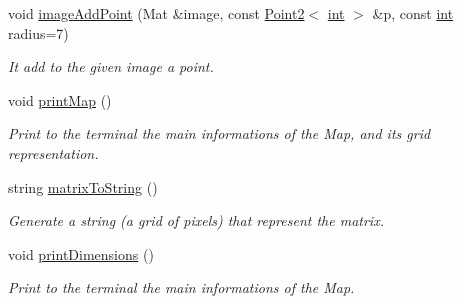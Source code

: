 \begin{DoxyCompactItemize}
void \mbox{\hyperlink{class_mapp_a198e313f3473420c99e6206645f94693}{image\+Add\+Point}} (Mat \&image, const \mbox{\hyperlink{class_point2}{Point2}}$<$ \mbox{\hyperlink{draw_8hh_aa620a13339ac3a1177c86edc549fda9b}{int}} $>$ \&p, const \mbox{\hyperlink{draw_8hh_aa620a13339ac3a1177c86edc549fda9b}{int}} radius=7)
\begin{DoxyCompactList}\small\item\em It add to the given image a point. \end{DoxyCompactList}\item 
void \mbox{\hyperlink{class_mapp_ab795b79c5d655f6a62303c4a415ee73c}{print\+Map}} ()
\begin{DoxyCompactList}\small\item\em Print to the terminal the main informations of the Map, and its grid representation. \end{DoxyCompactList}\item 
string \mbox{\hyperlink{class_mapp_ad38f31eac2ad66836325c152db1f88c3}{matrix\+To\+String}} ()
\begin{DoxyCompactList}\small\item\em Generate a string (a grid of pixels) that represent the matrix. \end{DoxyCompactList}\item 
void \mbox{\hyperlink{class_mapp_a0405773fd644d183c603b569e9957248}{print\+Dimensions}} ()
\begin{DoxyCompactList}\small\item\em Print to the terminal the main informations of the Map. \end{DoxyCompactList}\end{DoxyCompactItemize}
